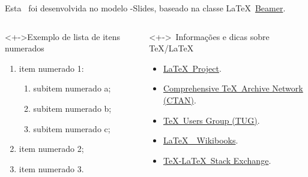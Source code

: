 \begin{frame}
	
	Esta \DocType\ foi desenvolvida no modelo \UTFPR-Slides, baseado na classe \LaTeX\ \href{https://www.ctan.org/pkg/beamer/}{Beamer\LinkIcon}.
	
	\pause%
	
	\begin{columns}[b]
		
		
		\begin{block}<+->{Exemplo de lista de itens numerados}
			
			\begin{enumerate}[<+-|alert@+>]
				\item item numerado 1:
				\begin{enumerate}
					\item subitem numerado a;
					\item subitem numerado b;
					\item subitem numerado c;
				\end{enumerate}
				\item item numerado 2;
				\item item numerado 3.
			\end{enumerate}
			
		\end{block}
		
		
		\begin{alertblock}<+->{\faInfoCircle\ Informações e dicas sobre \TeX/\LaTeX}
			
			\begin{itemize}
				\item \href{https://www.latex-project.org/}{\LaTeX\ Project\LinkIcon}.
				\item \href{https://www.ctan.org/}{Comprehensive \TeX\ Archive Network (CTAN)\LinkIcon}.
				\item \href{https://www.tug.org/}{\TeX\ Users Group (TUG)\LinkIcon}.
				\item \href{https://en.wikibooks.org/wiki/LaTeX/}{\LaTeX\ \textemdash\ Wikibooks\LinkIcon}.
				\item \href{https://tex.stackexchange.com/}{\TeX-\LaTeX\ Stack Exchange\LinkIcon}.
			\end{itemize}
			
		\end{alertblock}
		
	\end{columns}
	
\end{frame}